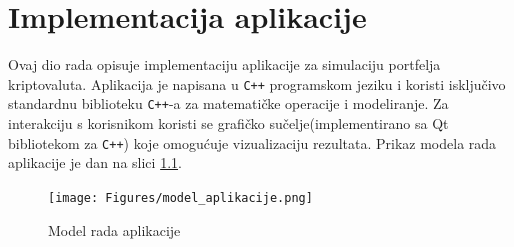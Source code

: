 \documentclass[zavrsnirad, upload]{fer}
\begin{document}
\chapter{Implementacija aplikacije}
\label{pog:implementacija}
Ovaj dio rada opisuje implementaciju aplikacije za simulaciju
portfelja kriptovaluta. Aplikacija je napisana u \texttt{C++} programskom
jeziku i koristi isključivo standardnu biblioteku \texttt{C++}-a za matematičke
operacije i modeliranje. Za interakciju s korisnikom koristi se
grafičko sučelje(implementirano sa Qt bibliotekom za \texttt{C++}) koje
omogućuje vizualizaciju rezultata. Prikaz modela rada aplikacije
je dan na slici \ref{fig:model_aplikacije}.
\\

\begin{figure}[H]
    \centering
    \texttt{[image: Figures/model\_aplikacije.png]}
    \caption{Model rada aplikacije}
    \label{fig:model_aplikacije}
\end{figure}
\end{document}
